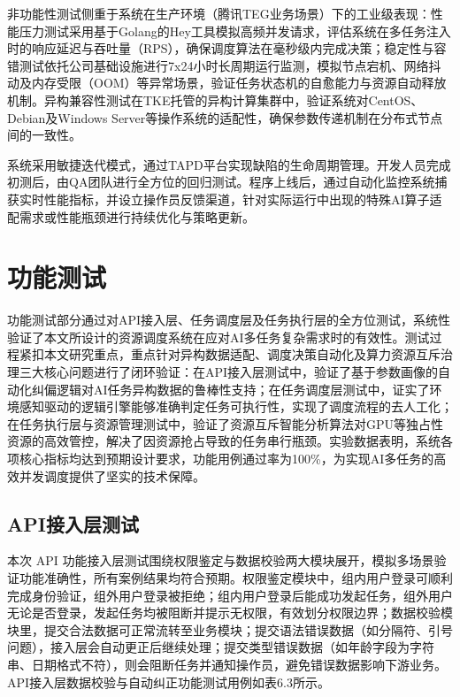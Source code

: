非功能性测试侧重于系统在生产环境（腾讯TEG业务场景）下的工业级表现：性能压力测试采用基于Golang的Hey工具模拟高频并发请求，评估系统在多任务注入时的响应延迟与吞吐量（RPS），确保调度算法在毫秒级内完成决策；稳定性与容错测试依托公司基础设施进行7x24小时长周期运行监测，模拟节点宕机、网络抖动及内存受限（OOM）等异常场景，验证任务状态机的自愈能力与资源自动释放机制。异构兼容性测试在TKE托管的异构计算集群中，验证系统对CentOS、Debian及Windows Server等操作系统的适配性，确保参数传递机制在分布式节点间的一致性。

系统采用敏捷迭代模式，通过TAPD平台实现缺陷的生命周期管理。开发人员完成初测后，由QA团队进行全方位的回归测试。程序上线后，通过自动化监控系统捕获实时性能指标，并设立操作员反馈渠道，针对实际运行中出现的特殊AI算子适配需求或性能瓶颈进行持续优化与策略更新。

\section{功能测试}

功能测试部分通过对API接入层、任务调度层及任务执行层的全方位测试，系统性验证了本文所设计的资源调度系统在应对AI多任务复杂需求时的有效性。测试过程紧扣本文研究重点，重点针对异构数据适配、调度决策自动化及算力资源互斥治理三大核心问题进行了闭环验证：在API接入层测试中，验证了基于参数画像的自动化纠偏逻辑对AI任务异构数据的鲁棒性支持；在任务调度层测试中，证实了环境感知驱动的逻辑引擎能够准确判定任务可执行性，实现了调度流程的去人工化；在任务执行层与资源管理测试中，验证了资源互斥智能分析算法对GPU等独占性资源的高效管控，解决了因资源抢占导致的任务串行瓶颈。实验数据表明，系统各项核心指标均达到预期设计要求，功能用例通过率为100\%，为实现AI多任务的高效并发调度提供了坚实的技术保障。

\subsection{API接入层测试}

本次 API 功能接入层测试围绕权限鉴定与数据校验两大模块展开，模拟多场景验证功能准确性，所有案例结果均符合预期。权限鉴定模块中，组内用户登录可顺利完成身份验证，组外用户登录被拒绝；组内用户登录后能成功发起任务，组外用户无论是否登录，发起任务均被阻断并提示无权限，有效划分权限边界；数据校验模块里，提交合法数据可正常流转至业务模块；提交语法错误数据（如分隔符、引号问题），接入层会自动更正后继续处理；提交类型错误数据（如年龄字段为字符串、日期格式不符），则会阻断任务并通知操作员，避免错误数据影响下游业务。
API接入层数据校验与自动纠正功能测试用例如表6.3所示。


